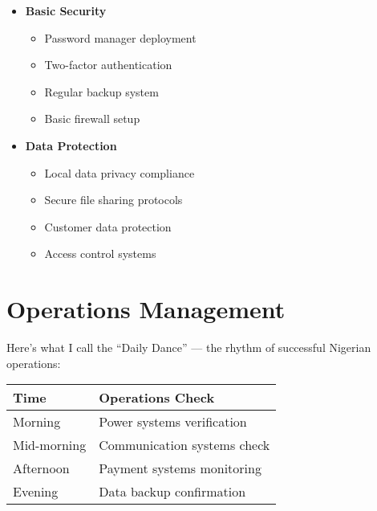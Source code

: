 \begin{tcolorbox}[colback=white,colframe=primarydark,title=\textbf{Security Framework}]
\begin{itemize}
    \item \textbf{Basic Security}
    \begin{itemize}
        \item Password manager deployment
        \item Two-factor authentication
        \item Regular backup system
        \item Basic firewall setup
    \end{itemize}

    \item \textbf{Data Protection}
    \begin{itemize}
        \item Local data privacy compliance
        \item Secure file sharing protocols
        \item Customer data protection
        \item Access control systems
    \end{itemize}
\end{itemize}
\end{tcolorbox}

\section{Operations Management}\label{sec:operations-management}

Here's what I call the ``Daily Dance'' --- the rhythm of successful Nigerian operations:

\begin{center}
\begin{tabularx}{\textwidth}{>{\raggedright\arraybackslash}X >{\raggedright\arraybackslash}X}
    \toprule
    \textbf{Time} & \textbf{Operations Check} \\
    \midrule
    Morning & Power systems verification \\
    Mid-morning & Communication systems check \\
    Afternoon & Payment systems monitoring \\
    Evening & Data backup confirmation \\
    \bottomrule
\end{tabularx}
\end{center}

